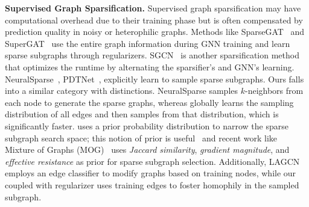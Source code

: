 
\noindent\textbf{Supervised Graph Sparsification.}
Supervised graph sparsification may have computational overhead due to their training phase but is often compensated by prediction quality in noisy or heterophilic graphs. Methods like SparseGAT~\cite{sparsegat} and SuperGAT~\cite{kim2022find} use the entire graph information during GNN training and learn sparse subgraphs through regularizers. 
SGCN~\cite{li2020sgcn} is another sparsification method that optimizes the runtime by alternating the sparsifier's and GNN's learning. 
NeuralSparse~\cite{zheng2020robust}, PDTNet~\cite{luo2021learning}, explicitly learn to sample sparse subgraphs. Ours \sgs falls into a similar category with distinctions. NeuralSparse samples $k$-neighbors from each node to generate the sparse graphs, whereas \sgs globally learns the sampling distribution of all edges and then samples from that distribution, which is significantly faster. 
\sgs uses a prior probability distribution to narrow the sparse subgraph search space; this notion of prior is useful~\cite{wang2024probability} and recent work like Mixture of Graphs (MOG)~\cite{zhang2024graph} uses \textit{Jaccard similarity}, \textit{gradient magnitude}, and \textit{effective resistance} as prior for sparse subgraph selection.
Additionally, LAGCN~\cite{chen2020label} employs an edge classifier to modify graphs based on training nodes, while our \edgemlp coupled with regularizer uses training edges to foster homophily in the sampled subgraph.
%
%
%
%
% 
